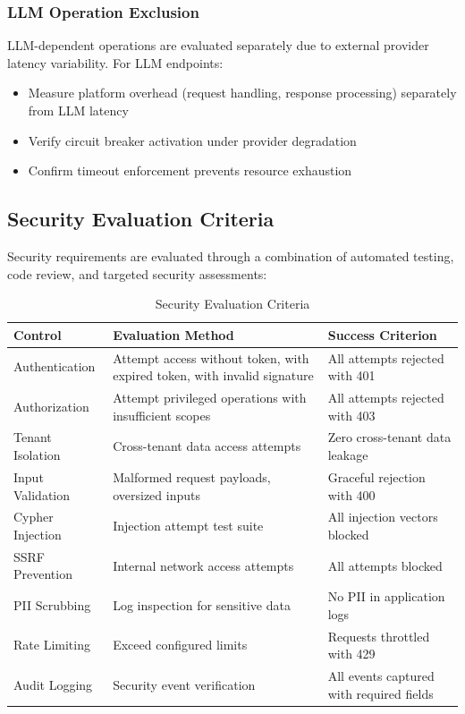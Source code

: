 \documentclass[a4paper,twoside]{sapthesis}
\begin{document}
\subsubsection{LLM Operation Exclusion}

LLM-dependent operations are evaluated separately due to external provider latency variability. For LLM endpoints:
\begin{itemize}
    \item Measure platform overhead (request handling, response processing) separately from LLM latency
    \item Verify circuit breaker activation under provider degradation
    \item Confirm timeout enforcement prevents resource exhaustion
\end{itemize}

\subsection{Security Evaluation Criteria}
\label{subsec:security-criteria}

Security requirements are evaluated through a combination of automated testing, code review, and targeted security assessments:

\begin{table}[htbp]
\centering
\caption{Security Evaluation Criteria}
\label{tab:security-eval}
\small
\begin{tabularx}{\textwidth}{|l|X|l|}
\hline
\textbf{Control} & \textbf{Evaluation Method} & \textbf{Success Criterion} \\
\midrule
Authentication & Attempt access without token, with expired token, with invalid signature & All attempts rejected with 401 \\
\midrule
Authorization & Attempt privileged operations with insufficient scopes & All attempts rejected with 403 \\
\midrule
Tenant Isolation & Cross-tenant data access attempts & Zero cross-tenant data leakage \\
\midrule
Input Validation & Malformed request payloads, oversized inputs & Graceful rejection with 400 \\
\midrule
Cypher Injection & Injection attempt test suite & All injection vectors blocked \\
\midrule
SSRF Prevention & Internal network access attempts & All attempts blocked \\
\midrule
PII Scrubbing & Log inspection for sensitive data & No PII in application logs \\
\midrule
Rate Limiting & Exceed configured limits & Requests throttled with 429 \\
\midrule
Audit Logging & Security event verification & All events captured with required fields \\
\midrule
\end{tabularx}
\end{table}
\end{document}
